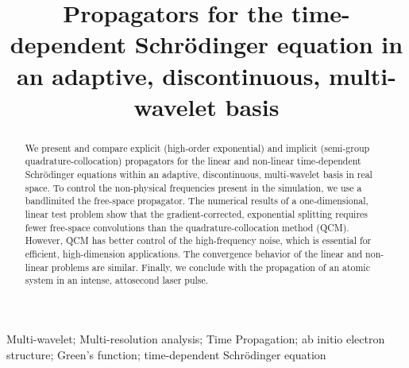 \documentclass[review,letterpaper]{elsarticle}
\newcommand{\comment}[1]{} %
\begin{document}
\begin{frontmatter}

\title{Propagators for the time-dependent Schr\"odinger equation in an adaptive, discontinuous, multi-wavelet basis}

\comment{
\author[corauthor,add]{Jun Jia} \ead{jiaj@ornl.gov}
\author[add]{Robert Harrison} \ead{harrisonrj@ornl.gov}
\and \author[add]{George Fann} \ead{fanngi@ornl.gov}
{\centering
\ George I. Fann\textsuperscript{1}, Robert J. Harrison\textsuperscript{1,2}, Jun Jia\textsuperscript{1}, Predrag Krsti\'c\textsuperscript{1}, and Nicholas E. Vence\textsuperscript{2}
\par}

\address[add]{Oak Ridge National Laboratory, Oak Ridge, TN 37831-6367, USA}
\corauth[corauthor]{Corresponding author.}
}

\begin{abstract}

We present and compare explicit (high-order exponential) and implicit
(semi-group quadrature-collocation) propagators for the linear and non-linear time-dependent
Schr\"odinger equations within an adaptive, discontinuous, multi-wavelet basis in real space.
To control the non-physical frequencies present in the simulation, we use a bandlimited the free-space propagator.
The numerical results of a one-dimensional, linear test problem show that the gradient-corrected, exponential splitting requires fewer free-space convolutions than the quadrature-collocation method (QCM).
However, QCM has better control of the high-frequency noise, which is essential for efficient, high-dimension applications. The convergence behavior of the linear and non-linear problems are similar. Finally, we conclude with the propagation of an atomic system in an intense, attosecond laser pulse.
\end{abstract}

\begin{keyword}
Multi-wavelet; Multi-resolution analysis; Time Propagation; ab initio electron structure;
Green's function; time-dependent Schr\"odinger equation
\comment{
{\em Subject classifications:}
  65B05, %
  65F10, %
  65M99. %
}
\end{keyword}

\end{frontmatter}
\end{document}
